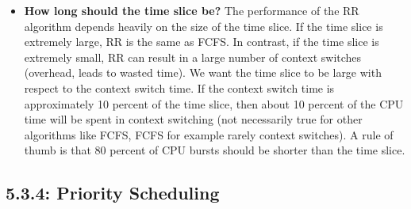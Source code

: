\documentclass[12pt]{article}
\begin{document}
\begin{itemize}
    \item \textbf{How long should the time slice be?} The performance of the RR algorithm depends heavily on the size of the time slice. If the time slice is extremely large, RR is the same as FCFS. In contrast, if the time slice is extremely small, RR can result in a large number of context switches (overhead, leads to wasted time). We want the time slice to be large with respect to the context switch time. If the context switch time is approximately 10 percent of the time slice, then about 10 percent of the CPU time will be spent in context switching (not necessarily true for other algorithms like FCFS, FCFS for example rarely context switches). A rule of thumb is that 80 percent of CPU bursts should be shorter than the time slice.
\end{itemize}

\subsection*{5.3.4: Priority Scheduling}
\end{document}
